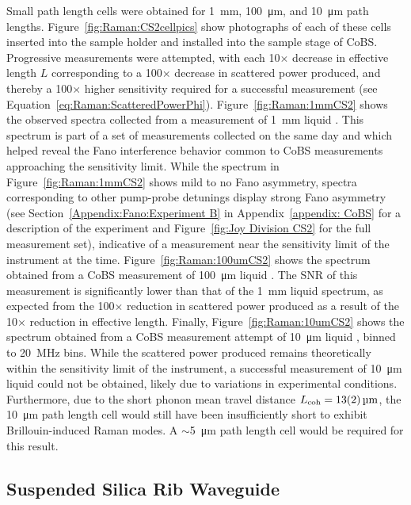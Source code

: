 Small path length cells were obtained for \SI{1}{\milli\meter}, \SI{100}{\micro\meter}, and \SI{10}{\micro\meter} path lengths. Figure~\ref{fig:Raman:CS2cellpics} show photographs of each of these cells inserted into the sample holder and installed into the sample stage of \ac{CoBS}. Progressive measurements were attempted, with each 10\(\times\) decrease in effective length \(L\) corresponding to a 100\(\times\) decrease in scattered power produced, and thereby a 100\(\times\) higher sensitivity required for a successful measurement (see Equation~\ref{eq:Raman:ScatteredPowerPhi}). Figure~\ref{fig:Raman:1mmCS2} shows the observed spectra collected from a measurement of \SI{1}{\milli\meter} liquid . This spectrum is part of a set of measurements collected on the same day and which helped reveal the Fano interference behavior common to \ac{CoBS} measurements approaching the sensitivity limit. While the spectrum in Figure~\ref{fig:Raman:1mmCS2} shows mild to no Fano asymmetry, spectra corresponding to other pump-probe detunings display strong Fano asymmetry (see Section~\ref{Appendix:Fano:Experiment B} in Appendix~\ref{appendix: CoBS} for a description of the experiment and Figure~\ref{fig:Joy Division CS2} for the full measurement set), indicative of a measurement near the sensitivity limit of the instrument at the time. Figure~\ref{fig:Raman:100umCS2} shows the spectrum obtained from a \ac{CoBS} measurement of \SI{100}{\micro\meter} liquid . The \ac{SNR} of this measurement is significantly lower than that of the \SI{1}{\milli\meter} liquid  spectrum, as expected from the 100\(\times\) reduction in scattered power produced as a result of the 10\(\times\) reduction in effective length. Finally, Figure~\ref{fig:Raman:10umCS2} shows the spectrum obtained from a \ac{CoBS} measurement attempt of \SI{10}{\micro\meter} liquid , binned to \SI{20}{\mega\hertz} bins. While the scattered power produced remains theoretically within the sensitivity limit of the instrument, a successful measurement of \SI{10}{\micro\meter} liquid  could not be obtained, likely due to variations in experimental conditions. Furthermore, due to the short phonon mean travel distance \(L_{\rm coh} = \SI{13(2)}{\micro\meter}\), the \SI{10}{\micro\meter} path length cell would still have been insufficiently short to exhibit Brillouin-induced Raman modes. A \(\sim\)\SI{5}{\micro\meter} path length cell would be required for this result.

\subsection{Suspended Silica Rib Waveguide}
\label{subsec:Raman:Target:Waveguide}

